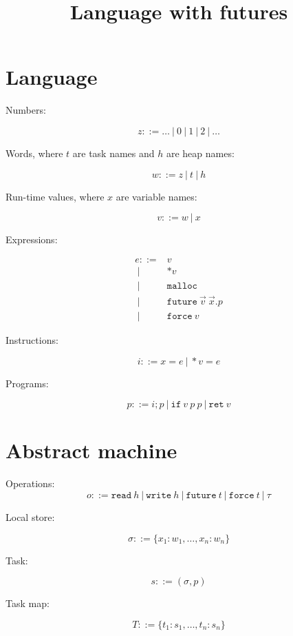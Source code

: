 \documentclass{article}
\title{Language with futures}
\date{}
\newcommand{\Prog}{p}
\newcommand{\Word}{w}
\newcommand{\Val}{v}
\newcommand{\TaskMap}{T}
\newcommand{\Task}{s}
\newcommand{\TName}{t}
\newcommand{\HName}{h}
\newcommand{\Local}{\sigma}
\newcommand{\Inst}{i}
\newcommand{\Op}{o}
\newcommand{\Var}{x}
\newcommand{\Exp}{e}
\newcommand{\Deref}[1][\Val]{*{#1}}
\newcommand{\Store}[1][\Val]{\Deref[{#1}] = }
\newcommand{\Nat}{z}
\newcommand{\Malloc}{\mathtt{malloc}}
\newcommand{\Future}[3]{\mathtt{future}\ {#1}\ {#2}.{#3}}
\newcommand{\Force}[1][\Val]{\mathtt{force}\ {#1}}
\newcommand{\If}[3][\Val]{\mathtt{if}\ {#1}\ {#2}\ {#3}}
\newcommand{\Ret}[1][\Val]{\mathtt{ret}\ {#1}}
\newcommand{\grmor}{|}
\newcommand{\Grmor}{\ \grmor\ }
\newcommand{\Grmeq}{::=}
\newcommand{\WRITE}[1]{\mathtt{write}\ {#1}}
\newcommand{\READ}[1]{\mathtt{read}\ {#1}}
\newcommand{\FUTURE}[1]{\mathtt{future}\ {#1}}
\newcommand{\FORCE}[1]{\mathtt{force}\ {#1}}
\newcommand{\TAU}{\tau}
\begin{document}
\maketitle

\section{Language}


Numbers:

$$
\Nat \Grmeq \dots \Grmor 0 \Grmor 1 \Grmor 2 \Grmor \dots
$$

Words, where $\TName$ are task names and $\HName$ are heap names:

$$
\Word \Grmeq \Nat \Grmor \TName \Grmor \HName
$$

Run-time values, where $\Var$ are variable names:

$$
\Val \Grmeq \Word \Grmor \Var
$$

Expressions:

$$
\begin{aligned}
\Exp    \Grmeq & \Val  \\
        \Grmor & \Deref \\
        \Grmor & \Malloc \\
        \Grmor & \Future {\vec \Val}  {\vec \Var} \Prog \\
        \Grmor & \Force 
\end{aligned}
$$

Instructions:

$$
\Inst \Grmeq \Var = \Exp \Grmor \Store \Exp
$$

Programs:

$$
\Prog \Grmeq \Inst; \Prog \Grmor \If \Prog \Prog \Grmor \Ret
$$

\section{Abstract machine}

Operations:
$$
\Op \Grmeq \READ \HName \Grmor \WRITE \HName \Grmor  \FUTURE \TName \Grmor \FORCE \TName \Grmor \TAU
$$

Local store:

$$
\sigma ::= \{\Var_1:\Word_1,\dots,\Var_n:\Word_n\}
$$

Task:

$$
\Task \Grmeq (\Local, \Prog)
$$

Task map:

$$
\TaskMap ::= \{\TName_1:\Task_1,\dots,\TName_n:\Task_n\}
$$
\end{document}
